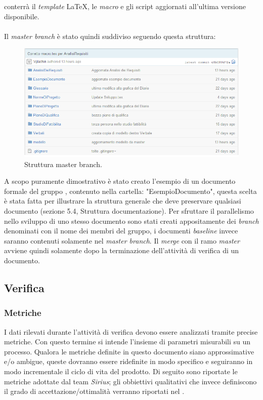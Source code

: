 conterrà il \textit{template} \LaTeX, le \textit{macro} e gli script aggiornati all'ultima versione disponibile.
\\
\\
Il \textit{master branch} è stato quindi suddiviso seguendo questa struttura:
\begin{figure}
\centering
\includegraphics[width= %
\linewidth]{immaginiNDP/repository}
\caption[]{Struttura master branch.}
\label{fig:repository}
\end{figure}
A scopo puramente dimostrativo è stato creato l'esempio di un documento formale del gruppo \gruppo, contenuto nella cartella: "EsempioDocumento", questa scelta è stata fatta per illustrare la struttura generale che deve preservare qualsiasi documento (sezione 5.4, Struttura documentazione).
Per sfruttare il parallelismo nello sviluppo di uno stesso documento sono stati creati appositamente dei  \textit{branch} denominati con il nome dei membri del gruppo, i documenti  \textit{baseline} invece saranno contenuti solamente nel \textit{master branch}. Il \textit{merge} con il ramo \textit{master} avviene quindi solamente dopo la terminazione dell'attività di verifica di un documento.

\subsection{Verifica}
\subsubsection{Metriche}
I dati rilevati durante l'attività di verifica devono essere analizzati tramite precise metriche.
Con questo termine si intende l'insieme di parametri misurabili su un processo. Qualora le metriche definite in questo documento siano approssimative e/o ambigue, queste dovranno essere ridefinite in modo specifico e seguiranno in modo incrementale il ciclo di vita del prodotto. Di seguito sono riportate le metriche adottate dal team \textit{Sirius}; gli obbiettivi qualitativi che invece definiscono il grado di accettazione/ottimalità verranno riportati nel \PianoDiQualifica.
